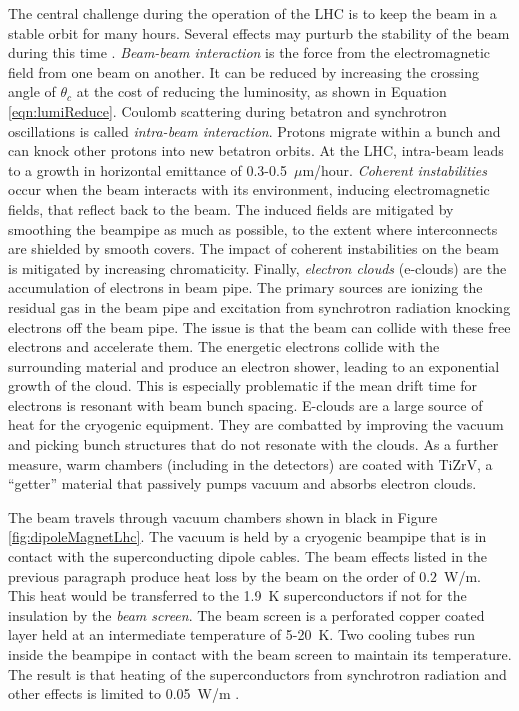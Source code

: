 The central challenge during the operation of the LHC is to keep the beam in a stable orbit for many hours.
Several effects may purturb the stability of the beam during this time \cite{lyndon}.
\emph{Beam-beam interaction} is the force from the electromagnetic field from one beam on another. It can be reduced by increasing the crossing angle of $\theta_c$ at the cost of reducing the luminosity, as shown in Equation \ref{eqn:lumiReduce}.
Coulomb scattering during betatron and synchrotron oscillations is called \emph{intra-beam interaction}.
Protons migrate within a bunch and can knock other protons into new betatron orbits. At the LHC, intra-beam leads to a growth in horizontal emittance of 0.3-0.5~$\mu$m/hour.
\emph{Coherent instabilities} occur when the beam interacts with its environment, inducing electromagnetic fields, that reflect back to the beam.
The induced fields are mitigated by smoothing the beampipe as much as possible, to the extent where interconnects are shielded by smooth covers.
The impact of coherent instabilities on the beam is mitigated by increasing chromaticity.
Finally, \emph{electron clouds} (e-clouds) are the accumulation of electrons in beam pipe.
The primary sources are ionizing the residual gas in the beam pipe and excitation from synchrotron radiation knocking electrons off the beam pipe.
The issue is that the beam can collide with these free electrons and accelerate them.
The energetic electrons collide with the surrounding material and produce an electron shower, leading to an exponential growth of the cloud.
This is especially problematic if the mean drift time for electrons is resonant with beam bunch spacing.
E-clouds are a large source of heat for the cryogenic equipment. 
They are combatted by improving the vacuum and picking bunch structures that do not resonate with the clouds.
As a further measure, warm chambers (including in the detectors) are coated with TiZrV, a ``getter'' material that passively pumps vacuum and absorbs electron clouds.

The beam travels through vacuum chambers shown in black in Figure \ref{fig:dipoleMagnetLhc}.
The vacuum is held by a cryogenic beampipe that is in contact with the superconducting dipole cables.
The beam effects listed in the previous paragraph produce heat loss by the beam on the order of $0.2$~W/m.
This heat would be transferred to the 1.9~K superconductors if not for the insulation by the \emph{beam screen}.
The beam screen is a perforated copper coated layer held at an intermediate temperature of 5-20~K.
Two cooling tubes run inside the beampipe in contact with the beam screen to maintain its temperature. 
The result is that heating of the superconductors from synchrotron radiation and other effects is limited to 0.05~W/m \cite{beamscreen}.


